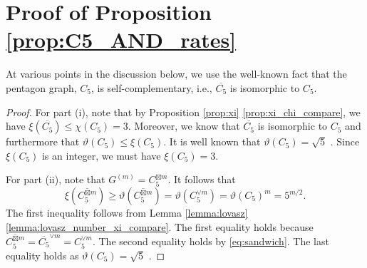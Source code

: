 \documentclass[journal, onecolumn, draftcls]{IEEEtran}
\theoremstyle{definition}
\begin{document}
\section{Proof of Proposition \ref{prop:C5_AND_rates}}
\label{app:pf_prop10} At various points in the discussion below, we use the well-known fact that the pentagon graph, $C_5$, is self-complementary, i.e., $\overline{C_5}$ is isomorphic to $C_5$.
\begin{proof} 
For part (i), note that by Proposition \ref{prop:xi} \ref{prop:xi_chi_compare}, we have $\xi(\overline{C_5}) \le \chi(C_5) =3 $. Moreover, we know that $\overline{C_5}$ is isomorphic to $C_5$ and furthermore that $\vartheta(C_5) \le \xi(C_5)$. It is well known that $\vartheta(C_5) = \sqrt{5}$ \cite{lovasz1979shannon}. Since $\xi(C_5)$ is an integer, we must have $\xi(C_5) =3$.

\noindent For part (ii), note that $G^{(m)} = C_5^{\boxtimes m}$. It follows that 
\begin{equation}\label{eqn:lowbound_xi(C5_OR_m)}
    \xi(\overline{C_5^{\boxtimes m}}) \ge \vartheta(\overline{C_5^{\boxtimes m}})=\vartheta({C_5^{\lor m}})= \vartheta({C_5})^m = 5^{m/2}.    
\end{equation}
%
The first inequality follows from Lemma \ref{lemma:lovasz} \ref{lemma:lovasz_number_xi_compare}. The first equality holds because $\overline{C_5^{\boxtimes m}} = \overline{C_5}^{\lor m}= {C_5^{\lor m}}$. The second equality holds by  \eqref{eq:sandwich}. The last equality holds as $\vartheta(C_5) =\sqrt{5}$ \cite{lovasz1979shannon}. 


\end{proof}
\end{document}
